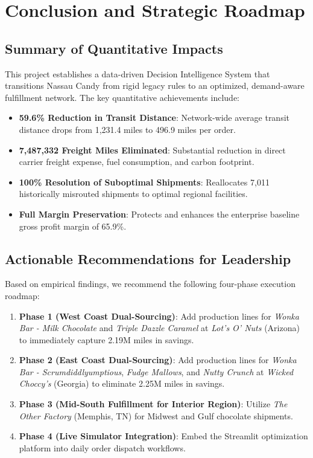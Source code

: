 \documentclass[12pt]{article}
\begin{document}
\newpage

\section{Conclusion and Strategic Roadmap}

\subsection{Summary of Quantitative Impacts}

This project establishes a data-driven Decision Intelligence System that transitions Nassau Candy from rigid legacy rules to an optimized, demand-aware fulfillment network. The key quantitative achievements include:
\begin{itemize}
    \item \textbf{59.6\% Reduction in Transit Distance}: Network-wide average transit distance drops from 1,231.4 miles to 496.9 miles per order.
    \item \textbf{7,487,332 Freight Miles Eliminated}: Substantial reduction in direct carrier freight expense, fuel consumption, and carbon footprint.
    \item \textbf{100\% Resolution of Suboptimal Shipments}: Reallocates 7,011 historically misrouted shipments to optimal regional facilities.
    \item \textbf{Full Margin Preservation}: Protects and enhances the enterprise baseline gross profit margin of 65.9\%.
\end{itemize}

\subsection{Actionable Recommendations for Leadership}

Based on empirical findings, we recommend the following four-phase execution roadmap:
\begin{enumerate}
    \item \textbf{Phase 1 (West Coast Dual-Sourcing)}: Add production lines for \textit{Wonka Bar - Milk Chocolate} and \textit{Triple Dazzle Caramel} at \textit{Lot's O' Nuts} (Arizona) to immediately capture 2.19M miles in savings.
    \item \textbf{Phase 2 (East Coast Dual-Sourcing)}: Add production lines for \textit{Wonka Bar - Scrumdiddlyumptious}, \textit{Fudge Mallows}, and \textit{Nutty Crunch} at \textit{Wicked Choccy's} (Georgia) to eliminate 2.25M miles in savings.
    \item \textbf{Phase 3 (Mid-South Fulfillment for Interior Region)}: Utilize \textit{The Other Factory} (Memphis, TN) for Midwest and Gulf chocolate shipments.
    \item \textbf{Phase 4 (Live Simulator Integration)}: Embed the Streamlit optimization platform into daily order dispatch workflows.
\end{enumerate}
\end{document}
